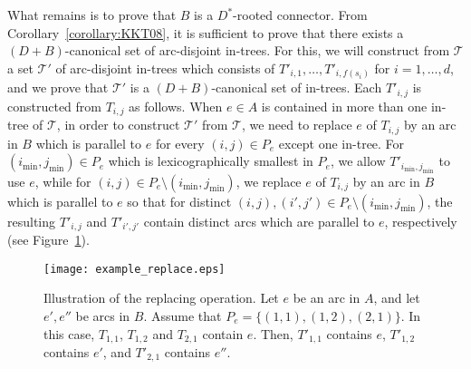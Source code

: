 \documentclass[11pt]{article}
\newcounter{ni}
\theoremstyle{plain}
\newcommand{\eop}{\hfill \usebox{\ProofSym}}
\newenvironment{proof}{\noindent {\it Proof.}}{\eop\par\vspace{0.3cm}}
\begin{document}
\begin{proof}
What remains is to prove that $B$ is a $D^{\ast}$-rooted connector. 
From Corollary~\ref{corollary:KKT08}, it is sufficient to  
prove that there exists a $(D+B)$-canonical set of arc-disjoint in-trees.
For this, we will construct from $\mathcal{T}$ a set $\mathcal{T}'$ of arc-disjoint in-trees 
which consists of $T'_{i,1},\ldots,T'_{i,f(s_i)}$ for $i=1,\ldots,d$,
and we prove that $\mathcal{T}'$ is a $(D+B)$-canonical set of in-trees.
Each $T'_{i,j}$ is constructed from $T_{i,j}$ as follows. 
When $e \in A$ is contained in more than one in-tree of $\mathcal{T}$, 
in order to construct $\mathcal{T}'$ from $\mathcal{T}$, 
we need to replace $e$ of $T_{i,j}$ by an arc in $B$ which is parallel to $e$
for every $(i,j)\in P_e$ except one in-tree.
For $(i_{\min},j_{\min})\in P_e$ which is lexicographically smallest in $P_e$, 
we allow $T'_{i_{\min},j_{\min}}$ to use $e$, while for $(i,j)\in P_e\setminus (i_{\min},j_{\min})$, 
we replace $e$ of $T_{i,j}$ by an arc in $B$ which is parallel to $e$ 
so that for distinct $(i,j), (i',j') \in P_e\setminus (i_{\min},j_{\min})$, 
the resulting $T'_{i,j}$ and $T'_{i',j'}$ contain distinct arcs which are parallel to $e$, 
respectively (see Figure~\ref{example_replace}).

\begin{figure}[h]
\begin{center}
\texttt{[image: example\_replace.eps]}
\end{center}
\caption{\small Illustration of the replacing operation. Let $e$ be an arc in $A$, and 
let $e',e''$ be arcs in $B$. Assume that $P_e=\{(1,1),(1,2),(2,1)\}$. In this case, $T_{1,1}$, 
$T_{1,2}$ and $T_{2,1}$ contain $e$. Then, $T'_{1,1}$ contains $e$, $T'_{1,2}$ contains $e'$, 
and $T'_{2,1}$ contains $e''$.}
\label{example_replace}
\end{figure}
 

\end{proof}
\end{document}
